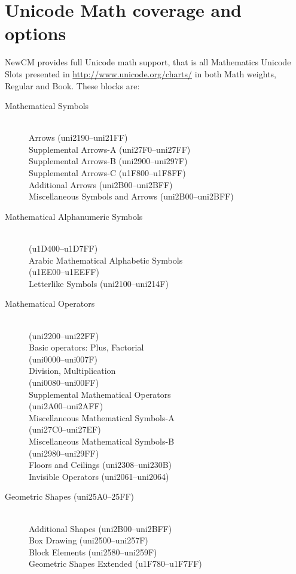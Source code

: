 \documentclass{article}
\begin{document}
\section{Unicode Math coverage and options}
NewCM provides
full Unicode math support, that is 
 all Mathematics Unicode Slots
 presented in \url{http://www.unicode.org/charts/}
  in both Math weights, Regular and Book. These blocks are:
\hspace*{-5em} \begin{description}
\item[Mathematical Symbols]
\ \\
Arrows (uni2190--uni21FF)\\
Supplemental Arrows-A (uni27F0--uni27FF)\\
Supplemental Arrows-B (uni2900--uni297F)\\
Supplemental Arrows-C (u1F800--u1F8FF)\\
Additional Arrows (uni2B00--uni2BFF)\\
Miscellaneous Symbols and Arrows (uni2B00--uni2BFF)
\item[Mathematical Alphanumeric Symbols] 
\ \\ (u1D400--u1D7FF)\\
     Arabic Mathematical Alphabetic Symbols\\ (u1EE00--u1EEFF)\\
     Letterlike Symbols (uni2100--uni214F)
\item[Mathematical Operators] 
\ \\ (uni2200--uni22FF)\\
    Basic operators: Plus, Factorial\\ (uni0000--uni007F)\\
             Division, Multiplication\\ (uni0080--uni00FF)\\
    Supplemental Mathematical Operators\\ (uni2A00--uni2AFF)\\
    Miscellaneous Mathematical Symbols-A\\ (uni27C0--uni27EF)\\
    Miscellaneous Mathematical Symbols-B\\ (uni2980--uni29FF)\\
    Floors and Ceilings (uni2308--uni230B)\\
    Invisible Operators (uni2061--uni2064)
  \item[Geometric Shapes (uni25A0--25FF)]
    \ \\
   Additional Shapes (uni2B00--uni2BFF)\\
   Box Drawing (uni2500--uni257F)\\
   Block Elements (uni2580--uni259F)\\
   Geometric Shapes Extended (u1F780--u1F7FF)
   \end{description}
\end{document}
